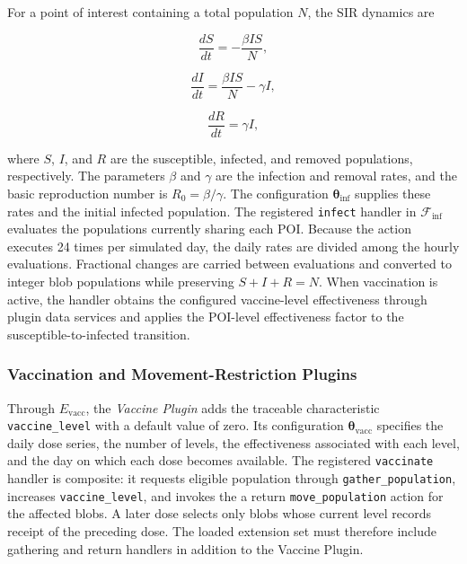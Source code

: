 For a point of interest containing a total population $N$, the SIR dynamics are

\begin{equation}
\label{eq:large_scale_epidemic_delta_s}
   \frac{dS}{dt}=-\frac{\beta I S}{N},
\end{equation}

\begin{equation}
\label{eq:large_scale_epidemic_delta_i}
   \frac{dI}{dt}=\frac{\beta I S}{N}-\gamma I,
\end{equation}

\begin{equation}
\label{eq:large_scale_epidemic_delta_r}
   \frac{dR}{dt}=\gamma I,
\end{equation}

where $S$, $I$, and $R$ are the susceptible, infected, and removed populations, respectively. The parameters $\beta$ and $\gamma$ are the infection and removal rates, and the basic reproduction number is $R_0=\beta/\gamma$. The configuration $\bm{\theta}_{\mathrm{inf}}$ supplies these rates and the initial infected population. The registered \texttt{infect} handler in $\mathcal{F}_{\mathrm{inf}}$ evaluates the populations currently sharing each POI. Because the action executes 24 times per simulated day, the daily rates are divided among the hourly evaluations. Fractional changes are carried between evaluations and converted to integer blob populations while preserving $S+I+R=N$. When vaccination is active, the handler obtains the configured vaccine-level effectiveness through plugin data services and applies the POI-level effectiveness factor to the susceptible-to-infected transition.

\subsubsection{Vaccination and Movement-Restriction Plugins}

Through $E_{\mathrm{vacc}}$, the \textit{Vaccine Plugin} adds the traceable characteristic \texttt{vaccine\_level} with a default value of zero. Its configuration $\bm{\theta}_{\mathrm{vacc}}$ specifies the daily dose series, the number of levels, the effectiveness associated with each level, and the day on which each dose becomes available. The registered \texttt{vaccinate} handler is composite: it requests eligible population through \texttt{gather\_population}, increases \texttt{vaccine\_level}, and invokes the a return \texttt{move\_population} action for the affected blobs. A later dose selects only blobs whose current level records receipt of the preceding dose. The loaded extension set must therefore include gathering and return handlers in addition to the Vaccine Plugin.

